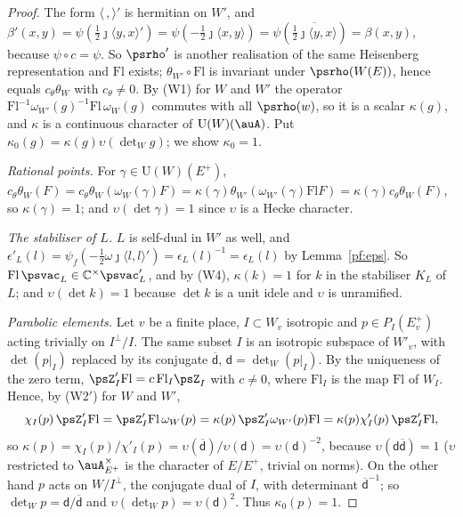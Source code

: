 \documentclass[10pt]{amsart}
\theoremstyle{definition}
\theoremstyle{remark}
\newcommand{\C}{\mathbb C}
\providecommand{\auU}{\mathrm U}
\providecommand{\aubar}[1]{\overline{#1}}
\begin{document}
\begin{proof}
The form $\langle\,,\rangle'$ is hermitian on $W'$, and $\beta'(x,y)=\psi(\tfrac12\jmath\langle
y,x\rangle')=\psi(-\tfrac12\jmath\langle x,y\rangle)=\psi(\aubar{\tfrac12\jmath\langle y,x\rangle})
=\beta(x,y)$, because $\psi\circ c=\psi$. So $\psrho'$ is another
realisation of the same Heisenberg representation and $\mathrm{Fl}$ exists; $\theta_{W'}\circ
\mathrm{Fl}$ is invariant under $\psrho(W(E))$, hence equals $c_\theta\theta_W$ with $c_\theta\ne0$.
By (W1) for $W$ and $W'$ the operator $\mathrm{Fl}^{-1}\omega_{W'}(g)^{-1}\mathrm{Fl}\,\omega_W(g)$
commutes with all $\psrho(w)$, so it is a scalar $\kappa(g)$, and $\kappa$ is a continuous
character of $\auU(W)(\auA)$. Put $\kappa_0(g)=\kappa(g)\upsilon(\det_Wg)$; we show $\kappa_0=1$.

\emph{Rational points.} For $\gamma\in\auU(W)(E^+)$, $c_\theta\theta_W(F)=c_\theta\theta_W(\omega_W
(\gamma)F)=\kappa(\gamma)\theta_{W'}(\omega_{W'}(\gamma)\mathrm{Fl}F)=\kappa(\gamma)c_\theta\theta_W
(F)$, so $\kappa(\gamma)=1$; and $\upsilon(\det\gamma)=1$ since $\upsilon$ is a Hecke character.

\emph{The stabiliser of $L$.} $L$ is self-dual in $W'$ as well, and $\epsilon'_L(l)=\psi_f(-\frac12\omega\jmath\langle l,l\rangle')=\epsilon_L(l)^{-1}=\epsilon_L(l)$
by Lemma~\ref{pf:eps}. So $\mathrm{Fl}\,\psvac_L\in\C^\times\psvac'_L$, and by (W4), $\kappa(k)=1$ for $k$
in the stabiliser $K_L$ of $L$; and $\upsilon(\det k)=1$ because $\det k$ is a unit idele and
$\upsilon$ is unramified.

\emph{Parabolic elements.} Let $v$ be a finite place, $I\subset W_v$ isotropic and $p\in P_I(E^+_v)$
acting trivially on $I^\perp/I$. The same subset $I$ is an isotropic subspace of $W'_v$, with
$\det(p|_I)$ replaced by its conjugate $\aubar{\mathsf d}$, $\mathsf d=\det\nolimits_W(p|_I)$. By
the uniqueness of the zero term, $\psZ'_I\mathrm{Fl}=c\,\mathrm{Fl}_I\psZ_I$ with $c\ne0$, where
$\mathrm{Fl}_I$ is the map $\mathrm{Fl}$ of $W_I$. Hence, by (W2$'$) for $W$ and $W'$,
\[
\chi_I(p)\,\psZ'_I\mathrm{Fl}=\psZ'_I\mathrm{Fl}\,\omega_W(p)=\kappa(p)\,\psZ'_I\omega_{W'}(p)
\mathrm{Fl}=\kappa(p)\chi'_I(p)\,\psZ'_I\mathrm{Fl},
\]
so $\kappa(p)=\chi_I(p)/\chi'_I(p)=\upsilon(\aubar{\mathsf d})/\upsilon(\mathsf d)=\upsilon(\mathsf
d)^{-2}$, because $\upsilon(\mathsf d\aubar{\mathsf d})=1$ ($\upsilon$ restricted to $\auA_{E^+}^
\times$ is the character of $E/E^+$, trivial on norms). On the other hand $p$ acts on $W/I^\perp$,
the conjugate dual of $I$, with determinant $\aubar{\mathsf d}^{-1}$; so $\det_Wp=\mathsf d/\aubar{
\mathsf d}$ and $\upsilon(\det_Wp)=\upsilon(\mathsf d)^2$. Thus $\kappa_0(p)=1$.


\end{proof}
\end{document}
